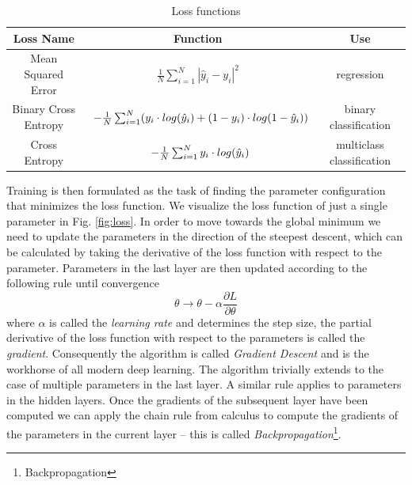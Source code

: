 \begin{table}
    \centering
    \renewcommand{\arraystretch}{1.3}
    \begin{tabular}{|c| c| c|}
    Loss Name & Function & Use \\[0.5ex] \hline
    Mean Squared Error & $\begin{array} {lcl} \frac{1}{N} \sum_{i=1}^N|\hat{y}_i - y_i|^2\end{array}$  & regression \\ [0.5ex]
    Binary Cross Entropy & $\begin{array} {r@{}l@{}} -\frac{1}{N} \sum_{i=1}^N (y_i \cdot log(\hat{y}_i) + (1 - y_i) \cdot log(1-\hat{y}_i)) \end{array}$ & binary classification \\ [0.5ex]
    Cross Entropy & $\begin{array} {r@{}l@{}} -\frac{1}{N} \sum_{i=1}^N y_i \cdot log(\hat{y}_i) \end{array}$ & multiclass classification \\ [0.5ex]
    \end{tabular}
    \caption{Loss functions}
    \label{table:losses}
\end{table}
Training is then formulated as the task of finding the parameter configuration that minimizes the loss function.
We visualize the loss function of just a single parameter in Fig. \ref{fig:loss}.
In order to move towards the global minimum we need to update the parameters in the direction of the steepest descent, which can be calculated by taking the derivative of the loss function with respect to the parameter.
Parameters in the last layer are then updated according to the following rule until convergence
\begin{equation}
    \label{eq:optimization}
    \theta \rightarrow \theta - \alpha \frac{\partial L}{\partial \theta}
\end{equation}
where $\alpha$ is called the \textit{learning rate} and determines the step size, the partial derivative of the loss function with respect to the parameters is called the \textit{gradient}.
Consequently the algorithm is called \textit{Gradient Descent} and is the workhorse of all modern deep learning.
The algorithm trivially extends to the case of multiple parameters in the last layer.
A similar rule applies to parameters in the hidden layers.
Once the gradients of the subsequent layer have been computed we can apply the chain rule from calculus to compute the gradients of the parameters in the current layer -- this is called \textit{Backpropagation}\footnote{Backpropagation}.


